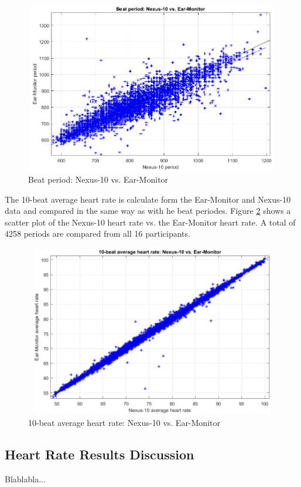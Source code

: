 \begin{figure}[H]
   \centering
   \includegraphics[width=12cm,height=7.5cm]{figs/PeriodScatter.png}
   \caption{Beat period: Nexus-10 vs. Ear-Monitor}
   \label{fig:PeriodScatter}
\end{figure}

The 10-beat average heart rate is calculate form the Ear-Monitor and Nexus-10 data and compared in the same way as with he beat periodes. Figure \ref{fig:HeartRateScatter} shows a scatter plot of the Nexus-10 heart rate vs. the Ear-Monitor heart rate. A total of 4258 periods are compared from all 16 participants.

\begin{figure}[H]
   \centering
   \includegraphics[width=12cm,height=7.5cm]{figs/HeartRateScatter.png}
   \caption{10-beat average heart rate: Nexus-10 vs. Ear-Monitor}
   \label{fig:HeartRateScatter}
\end{figure}

\subsection{Heart Rate Results Discussion}
Blablabla...
